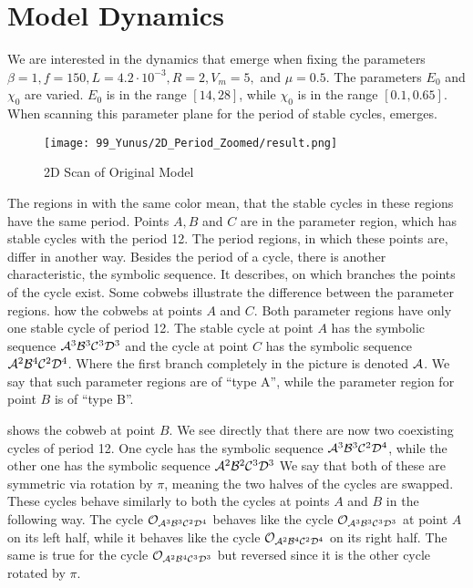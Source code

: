\section{Model Dynamics}
\label{sec:og.dynamics}

We are interested in the dynamics that emerge when fixing the parameters $\beta = 1, f = 150, L = 4.2 \cdot 10^{-3}, R = 2, V_m = 5,$ and $\mu = 0.5$.
The parameters $E_0$ and $\chi_0$ are varied.
$E_0$ is in the range $[14, 28]$, while $\chi_0$ is in the range $[0.1, 0.65]$.
When scanning this parameter plane for the period of stable cycles,  emerges.

\begin{figure}
    \centering
    \texttt{[image: 99\_Yunus/2D\_Period\_Zoomed/result.png]}
    \caption{2D Scan of Original Model}
    \label{fig:yunus.2pi.2d.full}
\end{figure}

The regions in  with the same color mean, that the stable cycles in these regions have the same period.
Points $A, B$ and $C$ are in the parameter region, which has stable cycles with the period 12.
The period regions, in which these points are, differ in another way.
Besides the period of a cycle, there is another characteristic, the symbolic sequence.
It describes, on which branches the points of the cycle exist.
Some cobwebs illustrate the difference between the parameter regions.
 how the cobwebs at points $A$ and $C$.
Both parameter regions have only one stable cycle of period 12.
The stable cycle at point $A$ has the symbolic sequence $\mathcal{A}^3\mathcal{B}^3\mathcal{C}^3\mathcal{D}^3$ and the cycle at point $C$ has the symbolic sequence $\mathcal{A}^2\mathcal{B}^4\mathcal{C}^2\mathcal{D}^4$.
Where the first branch completely in the picture is denoted $\mathcal{A}$.
We say that such parameter regions are of ``type A'', while the parameter region for point $B$ is of ``type B''.

 shows the cobweb at point $B$.
We see directly that there are now two coexisting cycles of period 12.
One cycle has the symbolic sequence $\mathcal{A}^3\mathcal{B}^3\mathcal{C}^2\mathcal{D}^4$, while the other one has the symbolic sequence $\mathcal{A}^2\mathcal{B}^2\mathcal{C}^3\mathcal{D}^3$
We say that both of these are symmetric via rotation by $\pi$, meaning the two halves of the cycles are swapped.
These cycles behave similarly to both the cycles at points $A$ and $B$ in the following way.
The cycle $\mathcal{O}_{\mathcal{A}^3\mathcal{B}^3\mathcal{C}^2\mathcal{D}^4}$ behaves like the cycle $\mathcal{O}_{\mathcal{A}^3\mathcal{B}^3\mathcal{C}^3\mathcal{D}^3}$ at point $A$ on its left half, while it behaves like the cycle $\mathcal{O}_{\mathcal{A}^2\mathcal{B}^4\mathcal{C}^2\mathcal{D}^4}$ on its right half.
The same is true for the cycle $\mathcal{O}_{\mathcal{A}^2\mathcal{B}^4\mathcal{C}^3\mathcal{D}^3}$ but reversed since it is the other cycle rotated by $\pi$.

